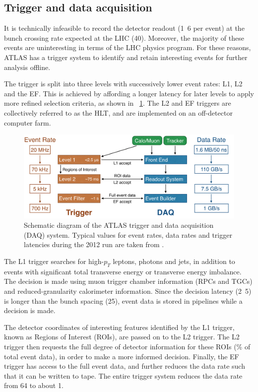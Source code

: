 \subsection{Trigger and data acquisition}

It is technically infeasible to record the detector readout (\unit{1.6}{\mega\bel} per 
event) at the bunch crossing rate expected at the \ac{LHC} (\unit{40}{\mega\hertz}).
Moreover, the majority of these events are uninteresting in terms of the \ac{LHC} physics 
program. For these reasons, ATLAS has a trigger system to identify and retain interesting
events for further analysis offline.

The trigger is split into three levels with successively lower event rates: \ac{L1}, 
\ac{L2} and the \ac{EF}. This is achieved by affording a longer latency for later levels 
to apply more refined selection criteria, as shown in \Figure~\ref{fig:trigger}. The 
\ac{L2} and \ac{EF} triggers are collectively referred to as the \ac{HLT}, and are 
implemented on an off-detector computer farm.
\begin{figure}[b]
	\includegraphics[width=\textwidth]{tex/experiment/trigger}
	\caption{Schematic diagram of the ATLAS trigger and data acquisition (DAQ) system.
	Typical values for event rates, data rates and trigger latencies during the 2012 run 
	are taken from \cite{TriggerNumbers}.}
	\label{fig:trigger}
\end{figure}

The \ac{L1} trigger searches for high-$p_T$ leptons, photons and jets, in addition to 
events with significant total transverse energy or transverse energy imbalance. The 
decision is made using muon trigger chamber information (\acp{RPC} and \acp{TGC}) and 
reduced-granularity calorimeter information. Since the decision latency 
(\unit{2.5}{\micro\second}) is longer than the bunch spacing (\unit{25}{\nano\second}),
event data is stored in pipelines while a decision is made.

The detector coordinates of interesting features identified by the \ac{L1} trigger, known 
as Regions of Interest (ROIs), are passed on to the \ac{L2} trigger. The \ac{L2} trigger 
then requests the full degree of detector information for these ROIs (\% of total
event data), in order to make a more informed decision. Finally, the \ac{EF} trigger has
access to the full event data, and further reduces the data rate such that it can be 
written to tape. The entire trigger system reduces the data rate from 
\unit{64}{\tera\bel\per\second} to about \unit{1}{\giga\bel\per\second}.



